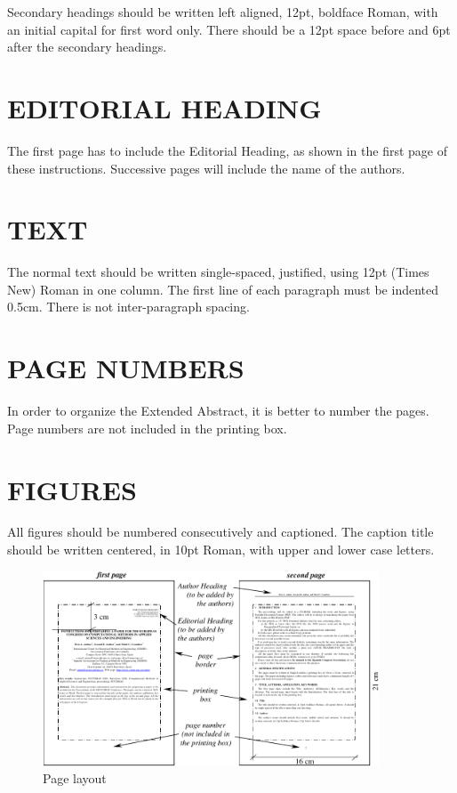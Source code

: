\documentclass{nordic}
\begin{document}
Secondary headings should be written left aligned, 12pt, boldface
Roman, with an initial capital for first word only. There should
be a 12pt space before and 6pt after the secondary headings.

\section{EDITORIAL HEADING}

The first page has to include the Editorial Heading, as shown in
the first page of these instructions. Successive pages will
include the name of the authors.

\section{TEXT}

The normal text should be written single-spaced, justified, using
12pt (Times New) Roman in one column. The first line of each
paragraph must be indented 0.5cm. There is not inter-paragraph
spacing.

\section{PAGE NUMBERS}

In order to organize the Extended Abstract, it is better to number
the pages. Page numbers are not included in the printing box.

\section{FIGURES}

All figures should be numbered consecutively and captioned. The
caption title should be written centered, in 10pt Roman, with
upper and lower case letters.
\begin{figure}[h!]
\centering
\includegraphics[width=10cm]{firstpage.pdf}
\caption{Page layout}
\end{figure}
\end{document}
